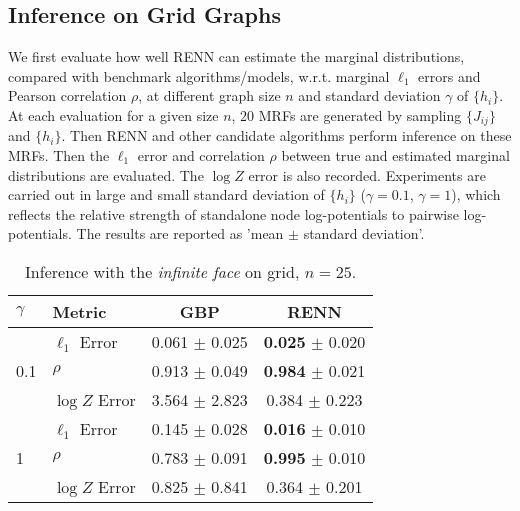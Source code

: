 \subsection{Inference on Grid Graphs}

We first evaluate how well RENN can estimate the marginal distributions, compared with benchmark algorithms/models, w.r.t. marginal $\ell_1$ errors and Pearson correlation $\rho$, at different graph size $n$ and standard deviation $\gamma$ of $\{h_i\}$. At each evaluation for a given size $n$, $20$ MRFs are generated by sampling $\{J_{ij}\}$ and $\{h_i\}$. Then RENN and other candidate algorithms perform inference on these MRFs. Then the $\ell_1$ error and correlation $\rho$ between true and estimated marginal distributions are evaluated. The $\log{Z}$ error is also recorded.
Experiments are carried out in large and small standard deviation of $\{h_i\}$ ($\gamma=0.1$, $\gamma=1$), which reflects the relative strength of standalone node log-potentials to pairwise log-potentials. The results are reported as 'mean $\pm$ standard deviation'.

\begin{table}[h]
  \vskip -0.2in
  \caption{Inference with the \textit{infinite face} on grid, $n=25$.}
  \label{tab:infer-infinite-face}
  \begin{center}
    \begin{small}
      
        \begin{tabular}{llcc}
          \toprule
          $\gamma$ & Metric & GBP & RENN \\
          \midrule
          \multirow{3}{*}{0.1}
                   & $\ell_1$ Error & 0.061 $\pm$ 0.025 & \textbf{0.025} $\pm$ 0.020 \\

                   & $\rho$   & 0.913 $\pm$ 0.049  &  \textbf{0.984} $\pm$ 0.021  \\
                   & $\log{Z}$ Error & 3.564 $\pm$ 2.823  &  0.384 $\pm$ 0.223  \\
          \midrule
          \multirow{3}{*}{1}
                   & $\ell_1$ Error & 0.145 $\pm$ 0.028  & \textbf{0.016} $\pm$ 0.010 \\

                   & $\rho$   & 0.783 $\pm$ 0.091  &  \textbf{0.995} $\pm$ 0.010 \\
                   & $\log{Z}$ Error & 0.825 $\pm$ 0.841  & 0.364 $\pm$ 0.201 \\
          
          \bottomrule
        \end{tabular}

    \end{small}
  \end{center}
  \vskip -0.2in
\end{table}







